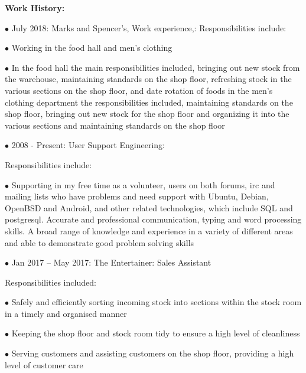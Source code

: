 \documentclass[12pt,a4paper]{book}
\begin{document}
\begin{flushleft}
\textbf {Work History:}

\item[$\bullet$] July 2018: Marks and Spencer's, Work experience,:
  \linebreak{}
Responsibilities include:

  \item[$\bullet$] Working in the food hall and men's clothing

  \item[$\bullet$] In the food hall the main responsibilities included, bringing out new
  stock from the warehouse, maintaining standards on the shop floor,
  refreshing stock in the various sections on the shop floor, and date
  rotation of foods in the men's clothing department the responsibilities included,
  maintaining standards on the shop floor, bringing out new stock for
  the shop floor and organizing it into the various sections and
  maintaining standards on the shop floor
\linebreak{}
  \item[$\bullet$] 2008 - Present: User Support Engineering: 

Responsibilities include:

  \item[$\bullet$]Supporting in my free time as a volunteer, users on both forums, irc
  and mailing lists who have problems and need support with Ubuntu,
  Debian, OpenBSD and Android, and other related technologies, which
  include SQL and postgresql. Accurate and professional communication, typing and word processing
  skills. A broad range of knowledge and experience in a variety of
  different areas and able to demonstrate good problem solving skills
\linebreak{}
\item[$\bullet$]Jan 2017 -- May 2017: The Entertainer: Sales Assistant
  
Responsibilities included:

  \item[$\bullet$]Safely and efficiently sorting incoming stock into sections within the
  stock room in a timely and organised manner

  \item[$\bullet$]Keeping the shop floor and stock room tidy to ensure a high level of
  cleanliness

  \item[$\bullet$]Serving customers and assisting customers on the shop floor, providing
  a high level of customer care


\end{flushleft}
\end{document}
